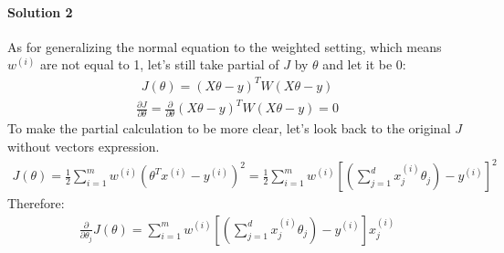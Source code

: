 \documentclass[paper=a4, fontsize=11pt]{scrartcl} %
\numberwithin{equation}{section} %
\numberwithin{figure}{section} %
\numberwithin{table}{section} %
\begin{document}
\paragraph{\textbf{Solution 2}}
As for generalizing the normal equation to the weighted setting, which means $w^{\left ( i \right )}$ are not equal to 1, let's still take partial of $J$ by $\theta$ and let it be 0:
\begin{align*}
J\left ( \theta  \right )=\left ( X\theta -y \right )^{T}W\left ( X\theta -y \right )
\end{align*}
\begin{align*}
\frac{\partial J }{\partial \theta}=\frac{\partial }{\partial \theta}\left ( X\theta -y \right )^{T}W\left ( X\theta -y \right )=0
\end{align*}
To make the partial calculation to be more clear, let's look back to the original $J$ without vectors expression.
\begin{align*}
J\left ( \theta  \right )=\frac{1}{2}\sum_{i=1}^{m}w^{\left ( i \right )}\left ( \theta ^{T}x^{\left ( i \right )}-y^{\left ( i \right )} \right )^{2}=\frac{1}{2}\sum_{i=1}^{m}w^{\left ( i \right )}\left [ \left ( \sum_{j=1}^{d}x_{j}^{\left ( i \right )}\theta _{j} \right )-y^{\left ( i \right )}\right ]^{2}
\end{align*}
Therefore:
\begin{align*}
\frac{\partial }{\partial \theta _{j}}J\left ( \theta  \right )=\sum_{i=1}^{m}w^{\left ( i \right )}\left [ \left (  \sum_{j=1}^{d}x_{j}^{\left ( i \right )}\theta _{j}\right )-y^{\left ( i \right )} \right ]x_{j}^{\left ( i \right )}
\end{align*}
\end{document}
